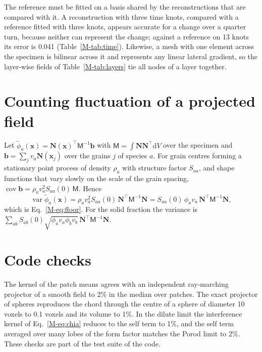 \documentclass[11pt]{article}
\newcommand{\dd}{\mathrm{d}}
\newcommand{\x}{\bm{x}}
\begin{document}
The reference must be fitted on a basis shared by the reconstructions that
are compared with it. A reconstruction with three time knots, compared with
a reference fitted with three knots, appears accurate for a change over a
quarter turn, because neither can represent the change; against a reference
on 13 knots its error is 0.041 (Table~\ref{M-tab:time}). Likewise, a mesh
with one element across the specimen is bilinear across it and represents
any linear lateral gradient, so the layer-wise fields of
Table~\ref{M-tab:layers} tie all nodes of a layer together.

\section{Counting fluctuation of a projected field}\label{sec:floor}

Let $\tilde\phi_a(\x)=\bm N(\x)^\top\mathsf M^{-1}\bm b$ with
$\mathsf M=\int\bm N\bm N^\top\dd V$ over the specimen and
$\bm b=\sum_jv_a\bm N(\x_j)$ over the grains $j$ of species $a$. For grain
centres forming a stationary point process of density $\rho_a$ with
structure factor $S_{aa}$, and shape functions that vary slowly on the scale
of the grain spacing,
$\operatorname{cov}\bm b=\rho_av_a^2S_{aa}(0)\,\mathsf M$. Hence
\begin{equation}
\operatorname{var}\tilde\phi_a(\x)=\rho_av_a^2S_{aa}(0)\,\bm N^\top\mathsf M^{-1}\bm N
=S_{aa}(0)\,\phi_av_a\,\bm N^\top\mathsf M^{-1}\bm N,
\end{equation}
which is Eq.~\eqref{M-eq:floor}. For the solid fraction the variance is
$\sum_{ab}S_{ab}(0)\sqrt{\phi_av_a\phi_bv_b}\,\bm N^\top\mathsf M^{-1}\bm N$.

\section{Code checks}

The kernel of the patch means agrees with an independent ray-marching
projector of a smooth field to 2\% in the median over patches. The exact
projector of spheres reproduces the chord through the centre of a sphere of
diameter 10 voxels to 0.1 voxels and its volume to 1\%. In the dilute limit
the interference kernel of Eq.~\eqref{M-eq:chia} reduces to the self term
to 1\%, and the self term averaged over many lobes of the form factor
matches the Porod limit to 2\%. These checks are part of the test suite of
the code.
\end{document}
